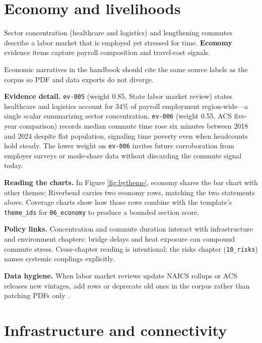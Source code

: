 \documentclass[
]{article}
\begin{document}
\newpage

\section{Economy and livelihoods}\label{economy-and-livelihoods}

Sector concentration (healthcare and logistics) and lengthening commutes
describe a labor market that is employed yet stressed for time.
\textbf{Economy} evidence items capture payroll composition and
travel-cost signals.

Economic narratives in the handbook should cite the same source labels
as the corpus so PDF and data exports do not diverge.

\textbf{Evidence detail.} \texttt{ev-005} (weight 0.85, State labor
market review) states healthcare and logistics account for 34\% of
payroll employment region-wide---a single scalar summarizing sector
concentration. \texttt{ev-006} (weight 0.55, ACS five-year comparison)
records median commute time rose six minutes between 2018 and 2024
despite flat population, signaling time poverty even when headcounts
hold steady. The lower weight on \texttt{ev-006} invites future
corroboration from employer surveys or mode-share data without
discarding the commute signal today.

\textbf{Reading the charts.} In Figure \ref{fig:bytheme}, economy shares
the bar chart with other themes; Riverbend carries two economy rows,
matching the two statements above. Coverage charts show how those rows
combine with the template's \texttt{theme\_ids} for \texttt{06\_economy}
to produce a bounded section score.

\textbf{Policy links.} Concentration and commute duration interact with
infrastructure and environment chapters: bridge delays and heat exposure
can compound commute stress. Cross-chapter reading is intentional; the
risks chapter (\texttt{10\_risks}) names systemic couplings explicitly.

\textbf{Data hygiene.} When labor market reviews update NAICS rollups or
ACS releases new vintages, add rows or deprecate old ones in the corpus
rather than patching PDFs only \citep{bowker2005}.

\newpage

\section{Infrastructure and
connectivity}\label{infrastructure-and-connectivity}
\end{document}
